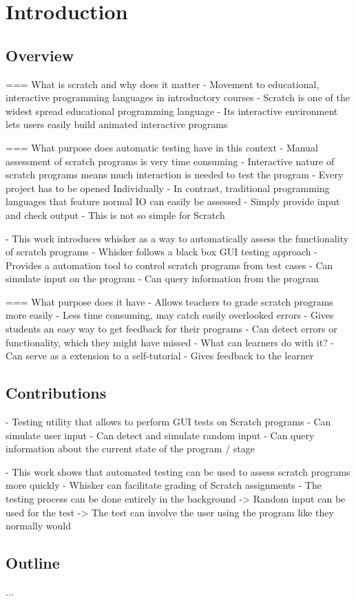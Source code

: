 \chapter{Introduction}

\section{Overview}
=== What is scratch and why does it matter
- Movement to educational, interactive programming languages in introductory courses
- Scratch is one of the widest spread educational programming language
- Its interactive environment lets users easily build animated interactive programs

=== What purpose does automatic testing have in this context
- Manual assessment of scratch programs is very time consuming
- Interactive nature of scratch programs means much interaction is needed to test the program
- Every project has to be opened Individually
- In contrast, traditional programming languages that feature normal IO can easily be assessed
- Simply provide input and check output
- This is not so simple for Scratch

- This work introduces whisker as a way to automatically assess the functionality of scratch programs
- Whisker follows a black box GUI testing approach
- Provides a automation tool to control scratch programs from test cases
    - Can simulate input on the program
    - Can query information from the program

=== What purpose does it have
- Allows teachers to grade scratch programs more easily
    - Less time consuming, may catch easily overlooked errors
    - Gives students an easy way to get feedback for their programs
        - Can detect errors or functionality, which they might have missed
- What can learners do with it?
    - Can serve as a extension to a self-tutorial
    - Gives feedback to the learner

\section{Contributions}
- Testing utility that allows to perform GUI tests on Scratch programs
- Can simulate user input
- Can detect and simulate random input
- Can query information about the current state of the program / stage

- This work shows that automated testing can be used to assess scratch programs more quickly
- Whisker can facilitate grading of Scratch assignments
- The testing process can be done entirely in the background
    -> Random input can be used for the test
    -> The test can involve the user using the program like they normally would

\section{Outline}
...

%
